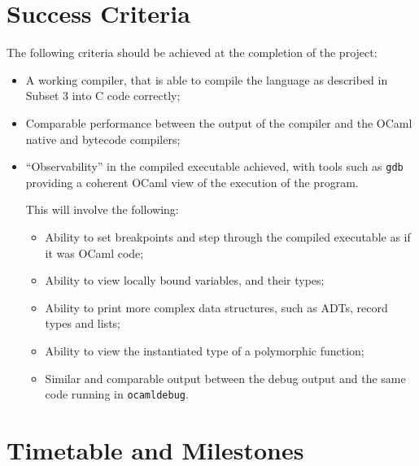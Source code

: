 \section*{Success Criteria}

The following criteria should be achieved at the completion of the project:

\begin{itemize}

    \item A working compiler, that is able to compile the language as described
        in Subset 3 into C code correctly;

    \item Comparable performance between the output of the compiler and the
        OCaml native and bytecode compilers;

    \item ``Observability'' in the compiled executable achieved, with tools
        such as \texttt{gdb} providing a coherent OCaml view of the execution
        of the program.

        This will involve the following:

        \begin{itemize}

            \item Ability to set breakpoints and step through the compiled executable
                as if it was OCaml code;

            \item Ability to view locally bound variables, and their types;

            \item Ability to print more complex data structures, such as ADTs,
                record types and lists;

            \item Ability to view the instantiated type of a polymorphic
                function;

            \item Similar and comparable output between the debug output and
                the same code running in \texttt{ocamldebug}.

        \end{itemize}

\end{itemize}

\newpage

\section*{Timetable and Milestones}

